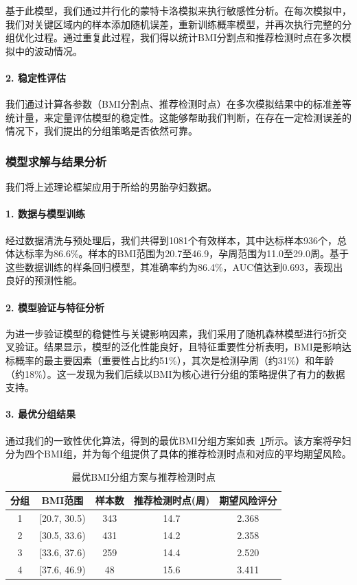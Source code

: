 基于此模型，我们通过并行化的蒙特卡洛模拟来执行敏感性分析。在每次模拟中，我们对关键区域内的样本添加随机误差，重新训练概率模型，并再次执行完整的分组优化过程。通过重复此过程，我们得以统计BMI分割点和推荐检测时点在多次模拟中的波动情况。

\paragraph{2. 稳定性评估}
我们通过计算各参数（BMI分割点、推荐检测时点）在多次模拟结果中的标准差等统计量，来定量评估模型的稳定性。这能够帮助我们判断，在存在一定检测误差的情况下，我们提出的分组策略是否依然可靠。

\subsubsection{模型求解与结果分析}

我们将上述理论框架应用于所给的男胎孕妇数据。

\paragraph{1. 数据与模型训练}
经过数据清洗与预处理后，我们共得到1081个有效样本，其中达标样本936个，总体达标率为86.6\%。样本的BMI范围为20.7至46.9，孕周范围为11.0至29.0周。基于这些数据训练的样条回归模型，其准确率约为86.4\%，AUC值达到0.693，表现出良好的预测性能。

\paragraph{2. 模型验证与特征分析}
为进一步验证模型的稳健性与关键影响因素，我们采用了随机森林模型进行5折交叉验证。结果显示，模型的泛化性能良好，且特征重要性分析表明，BMI是影响达标概率的最主要因素（重要性占比约51\%），其次是检测孕周（约31\%）和年龄（约18\%）。这一发现为我们后续以BMI为核心进行分组的策略提供了有力的数据支持。

\paragraph{3. 最优分组结果}
通过我们的一致性优化算法，得到的最优BMI分组方案如表~\ref{tab:optimal_grouping}所示。该方案将孕妇分为四个BMI组，并为每个组提供了具体的推荐检测时点和对应的平均期望风险。

\begin{table}[htbp]
\centering
\caption{最优BMI分组方案与推荐检测时点}
\label{tab:optimal_grouping}
\begin{tabular}{ccccc}
\toprule
分组 & BMI范围 & 样本数 & 推荐检测时点(周) & 期望风险评分 \\
\midrule
1 & [20.7, 30.5) & 343 & 14.7 & 2.368 \\
2 & [30.5, 33.6) & 431 & 14.2 & 2.358 \\
3 & [33.6, 37.6) & 259 & 14.4 & 2.520 \\
4 & [37.6, 46.9) & 48 & 15.6 & 3.411 \\
\bottomrule
\end{tabular}
\end{table}

